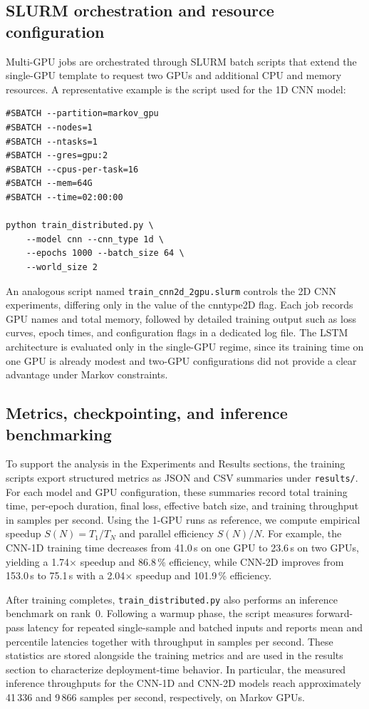\documentclass[sigconf]{acmart}
\begin{document}
\subsection{SLURM orchestration and resource configuration}

Multi-GPU jobs are orchestrated through SLURM batch scripts that extend the single-GPU template to request two GPUs and additional CPU and memory resources. A representative example is the script used for the 1D CNN model:
\begin{verbatim}
#SBATCH --partition=markov_gpu
#SBATCH --nodes=1
#SBATCH --ntasks=1
#SBATCH --gres=gpu:2
#SBATCH --cpus-per-task=16
#SBATCH --mem=64G
#SBATCH --time=02:00:00

python train_distributed.py \
    --model cnn --cnn_type 1d \
    --epochs 1000 --batch_size 64 \
    --world_size 2
\end{verbatim}
An analogous script named \verb|train_cnn2d_2gpu.slurm| controls the 2D CNN experiments, differing only in the value of the cnntype2D flag.
Each job records GPU names and total memory, followed by detailed training output such as loss curves, epoch times, and configuration flags in a dedicated log file. The LSTM architecture is evaluated only in the single-GPU regime, since its training time on one GPU is already modest and two-GPU configurations did not provide a clear advantage under Markov constraints.

\subsection{Metrics, checkpointing, and inference benchmarking}

To support the analysis in the Experiments and Results sections, the training scripts export structured metrics as JSON and CSV summaries under \texttt{results/}. For each model and GPU configuration, these summaries record total training time, per-epoch duration, final loss, effective batch size, and training throughput in samples per second. Using the 1-GPU runs as reference, we compute empirical speedup \(S(N) = T_1 / T_N\) and parallel efficiency \(S(N)/N\). For example, the CNN-1D training time decreases from 41.0\,s on one GPU to 23.6\,s on two GPUs, yielding a 1.74\(\times\) speedup and 86.8\,\% efficiency, while CNN-2D improves from 153.0\,s to 75.1\,s with a 2.04\(\times\) speedup and 101.9\,\% efficiency.

After training completes, \texttt{train\_distributed.py} also performs an inference benchmark on rank~0. Following a warmup phase, the script measures forward-pass latency for repeated single-sample and batched inputs and reports mean and percentile latencies together with throughput in samples per second. These statistics are stored alongside the training metrics and are used in the results section to characterize deployment-time behavior. In particular, the measured inference throughputs for the CNN-1D and CNN-2D models reach approximately 41\,336 and 9\,866 samples per second, respectively, on Markov GPUs.
\end{document}
